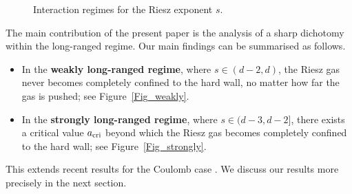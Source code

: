 \documentclass{amsart}
\theoremstyle{plain}
\theoremstyle{remark}
\numberwithin{equation}{section}
\begin{document}
\begin{figure}[t]

    \caption{
        Interaction regimes for the Riesz exponent \(s\).
    }
    \label{fig:interaction-regimes}
\end{figure}

The main contribution of the present paper is the analysis of a sharp dichotomy within the long-ranged regime. Our main findings can be summarised as follows. 
\begin{itemize}
    \item In the \textbf{weakly long-ranged regime}, where \(s\in(d-2,d)\), the Riesz gas never becomes completely confined to the hard wall, no matter how far the gas is pushed; see Figure~\ref{Fig_weakly}.
    
    \smallskip

    \item In the \textbf{strongly long-ranged regime}, where \(s\in(d-3,d-2]\), there exists a 
    critical value \(a_{\rm cri}\) 
    beyond which the Riesz gas becomes completely confined to the hard wall; see Figure~\ref{Fig_strongly}.
\end{itemize}
This extends recent results for the Coulomb case \cite{DKMSS17,ASZ14,BFMS26,FIT26}. We discuss our results more precisely in the next section. 
\end{document}
